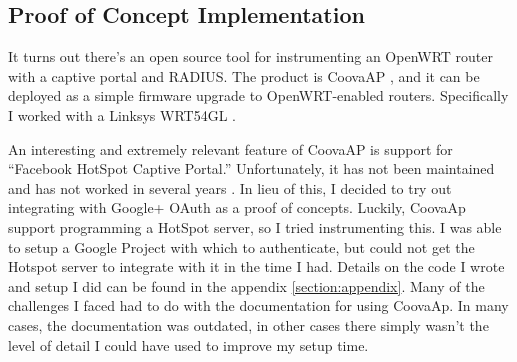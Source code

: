 \subsection{Proof of Concept Implementation}
It turns out there's an open source tool for instrumenting an OpenWRT router with a captive portal
and RADIUS. The product is CoovaAP \cite{product:CoovaAP}, and it can be deployed as a simple
firmware upgrade to OpenWRT-enabled routers. Specifically I worked with a Linksys WRT54GL
\cite{product:WRT54GL}.

An interesting and extremely relevant feature of CoovaAP is support for ``Facebook HotSpot Captive
Portal.'' Unfortunately, it has not been maintained and has not worked in several years
\cite{article:CoovaFacebookDead}. In lieu of this, I decided to try out integrating with Google+
OAuth as a proof of concepts. Luckily, CoovaAp support programming a HotSpot server, so I tried
instrumenting this. I was able to setup a Google Project with which to authenticate, but could not
get the Hotspot server to integrate with it in the time I had. Details on the code I wrote and
setup I did can be found in the appendix \ref{section:appendix}. Many of the challenges I faced
had to do with the documentation for using CoovaAp. In many cases, the documentation was outdated,
in other cases there simply wasn't the level of detail I could have used to improve my setup time.
